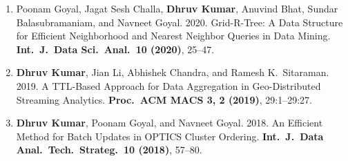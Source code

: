 \documentclass[10pt, a4paper]{article}
\begin{document}
\begin{enumerate}[label=\textbf{J\arabic*.}, leftmargin=2.8em, itemsep=0.3em]
\item Poonam Goyal, Jagat Sesh Challa, \textbf{Dhruv Kumar}, Anuvind Bhat, Sundar Balasubramaniam, and Navneet Goyal. 2020. Grid-R-Tree: A Data Structure for Efficient Neighborhood and Nearest Neighbor Queries in Data Mining. \textbf{Int.\ J.\ Data Sci.\ Anal.\ 10 (2020)}, 25--47.

\item \textbf{Dhruv Kumar}, Jian Li, Abhishek Chandra, and Ramesh K.\ Sitaraman. 2019. A TTL-Based Approach for Data Aggregation in Geo-Distributed Streaming Analytics. \textbf{Proc.\ ACM MACS 3, 2 (2019)}, 29:1--29:27.

\item \textbf{Dhruv Kumar}, Poonam Goyal, and Navneet Goyal. 2018. An Efficient Method for Batch Updates in OPTICS Cluster Ordering. \textbf{Int.\ J.\ Data Anal.\ Tech.\ Strateg.\ 10 (2018)}, 57--80.

\end{enumerate}

\end{document}

